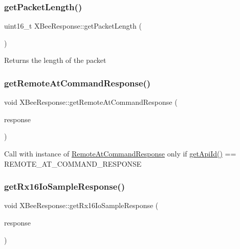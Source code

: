 \subsubsection{\texorpdfstring{get\+Packet\+Length()}{getPacketLength()}}
{\footnotesize\ttfamily uint16\+\_\+t X\+Bee\+Response\+::get\+Packet\+Length (\begin{DoxyParamCaption}{ }\end{DoxyParamCaption})}

Returns the length of the packet \hypertarget{class_x_bee_response_af359dab94c57006a0fb4b58986744c04}{}\label{class_x_bee_response_af359dab94c57006a0fb4b58986744c04} 
\subsubsection{\texorpdfstring{get\+Remote\+At\+Command\+Response()}{getRemoteAtCommandResponse()}}
{\footnotesize\ttfamily void X\+Bee\+Response\+::get\+Remote\+At\+Command\+Response (\begin{DoxyParamCaption}\item[{\hyperlink{class_x_bee_response}{X\+Bee\+Response} \&}]{response }\end{DoxyParamCaption})}

Call with instance of \hyperlink{class_remote_at_command_response}{Remote\+At\+Command\+Response} only if \hyperlink{class_x_bee_response_a4a9677e3b39054119fa278d1ad52130a}{get\+Api\+Id()} == R\+E\+M\+O\+T\+E\+\_\+\+A\+T\+\_\+\+C\+O\+M\+M\+A\+N\+D\+\_\+\+R\+E\+S\+P\+O\+N\+SE \hypertarget{class_x_bee_response_ae84d38e3759ebf8b23d256b207e5761d}{}\label{class_x_bee_response_ae84d38e3759ebf8b23d256b207e5761d} 
\subsubsection{\texorpdfstring{get\+Rx16\+Io\+Sample\+Response()}{getRx16IoSampleResponse()}}
{\footnotesize\ttfamily void X\+Bee\+Response\+::get\+Rx16\+Io\+Sample\+Response (\begin{DoxyParamCaption}\item[{\hyperlink{class_x_bee_response}{X\+Bee\+Response} \&}]{response }\end{DoxyParamCaption})}

